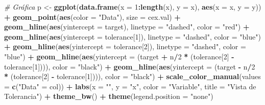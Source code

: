 \documentclass[
]{book}
\newenvironment{Shaded}{\begin{snugshade}}{\end{snugshade}}
\newcommand{\AttributeTok}[1]{\textcolor[rgb]{0.13,0.29,0.53}{#1}}
\newcommand{\CommentTok}[1]{\textcolor[rgb]{0.56,0.35,0.01}{\textit{#1}}}
\newcommand{\DecValTok}[1]{\textcolor[rgb]{0.00,0.00,0.81}{#1}}
\newcommand{\FunctionTok}[1]{\textcolor[rgb]{0.13,0.29,0.53}{\textbf{#1}}}
\newcommand{\NormalTok}[1]{#1}
\newcommand{\OtherTok}[1]{\textcolor[rgb]{0.56,0.35,0.01}{#1}}
\newcommand{\SpecialCharTok}[1]{\textcolor[rgb]{0.81,0.36,0.00}{\textbf{#1}}}
\newcommand{\StringTok}[1]{\textcolor[rgb]{0.31,0.60,0.02}{#1}}
\begin{document}
\begin{Shaded}
\begin{Highlighting}[]
  \CommentTok{\# Gráfica}
\NormalTok{  p }\OtherTok{\textless{}{-}} \FunctionTok{ggplot}\NormalTok{(}\FunctionTok{data.frame}\NormalTok{(}\AttributeTok{x =} \DecValTok{1}\SpecialCharTok{:}\FunctionTok{length}\NormalTok{(x), }\AttributeTok{y =}\NormalTok{ x), }\FunctionTok{aes}\NormalTok{(}\AttributeTok{x =}\NormalTok{ x, }\AttributeTok{y =}\NormalTok{ y)) }\SpecialCharTok{+}
    \FunctionTok{geom\_point}\NormalTok{(}\FunctionTok{aes}\NormalTok{(}\AttributeTok{color =} \StringTok{"Data"}\NormalTok{), }\AttributeTok{size =}\NormalTok{ cex.val) }\SpecialCharTok{+}
    \FunctionTok{geom\_hline}\NormalTok{(}\FunctionTok{aes}\NormalTok{(}\AttributeTok{yintercept =}\NormalTok{ target), }\AttributeTok{linetype =} \StringTok{"dashed"}\NormalTok{, }\AttributeTok{color =} \StringTok{"red"}\NormalTok{) }\SpecialCharTok{+}
    \FunctionTok{geom\_hline}\NormalTok{(}\FunctionTok{aes}\NormalTok{(}\AttributeTok{yintercept =}\NormalTok{ tolerance[}\DecValTok{1}\NormalTok{]), }\AttributeTok{linetype =} \StringTok{"dashed"}\NormalTok{, }\AttributeTok{color =} \StringTok{"blue"}\NormalTok{) }\SpecialCharTok{+}
    \FunctionTok{geom\_hline}\NormalTok{(}\FunctionTok{aes}\NormalTok{(}\AttributeTok{yintercept =}\NormalTok{ tolerance[}\DecValTok{2}\NormalTok{]), }\AttributeTok{linetype =} \StringTok{"dashed"}\NormalTok{, }\AttributeTok{color =} \StringTok{"blue"}\NormalTok{) }\SpecialCharTok{+}
    \FunctionTok{geom\_hline}\NormalTok{(}\FunctionTok{aes}\NormalTok{(}\AttributeTok{yintercept =}\NormalTok{ (target }\SpecialCharTok{+}\NormalTok{ n}\SpecialCharTok{/}\DecValTok{2} \SpecialCharTok{*}\NormalTok{ (tolerance[}\DecValTok{2}\NormalTok{] }\SpecialCharTok{{-}}\NormalTok{ tolerance[}\DecValTok{1}\NormalTok{]))), }\AttributeTok{color =} \StringTok{"black"}\NormalTok{) }\SpecialCharTok{+}
    \FunctionTok{geom\_hline}\NormalTok{(}\FunctionTok{aes}\NormalTok{(}\AttributeTok{yintercept =}\NormalTok{ (target }\SpecialCharTok{{-}}\NormalTok{ n}\SpecialCharTok{/}\DecValTok{2} \SpecialCharTok{*}\NormalTok{ (tolerance[}\DecValTok{2}\NormalTok{] }\SpecialCharTok{{-}}\NormalTok{ tolerance[}\DecValTok{1}\NormalTok{]))), }\AttributeTok{color =} \StringTok{"black"}\NormalTok{) }\SpecialCharTok{+}
    \FunctionTok{scale\_color\_manual}\NormalTok{(}\AttributeTok{values =} \FunctionTok{c}\NormalTok{(}\StringTok{"Data"} \OtherTok{=}\NormalTok{ col)) }\SpecialCharTok{+}
    \FunctionTok{labs}\NormalTok{(}\AttributeTok{x =} \StringTok{""}\NormalTok{, }\AttributeTok{y =} \StringTok{"x"}\NormalTok{, }\AttributeTok{color =} \StringTok{"Variable"}\NormalTok{, }\AttributeTok{title =} \StringTok{"Vista de Tolerancia"}\NormalTok{) }\SpecialCharTok{+}
    \FunctionTok{theme\_bw}\NormalTok{() }\SpecialCharTok{+} \FunctionTok{theme}\NormalTok{(}\AttributeTok{legend.position =} \StringTok{"none"}\NormalTok{)}
  

\end{Highlighting}
\end{Shaded}
\end{document}
